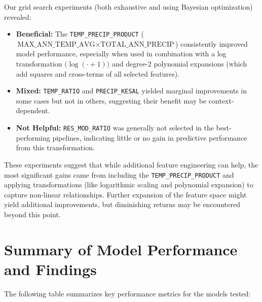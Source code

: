 \documentclass{article}
\begin{document}
Our grid search experiments (both exhaustive and using Bayesian optimization) revealed:
\begin{itemize}
    \item \textbf{Beneficial:} The \texttt{TEMP\_PRECIP\_PRODUCT} (\(\text{MAX\_ANN\_TEMP\_AVG} \times \text{TOTAL\_ANN\_PRECIP}\)) consistently improved model performance, especially when used in combination with a log transformation \(\bigl(\log(\cdot + 1)\bigr)\) and degree-2 polynomial expansions (which add squares and cross-terms of all selected features).
    \item \textbf{Mixed:} \texttt{TEMP\_RATIO} and \texttt{PRECIP\_KESAL} yielded marginal improvements in some cases but not in others, suggesting their benefit may be context-dependent.
    \item \textbf{Not Helpful:} \texttt{RES\_MOD\_RATIO} was generally not selected in the best-performing pipelines, indicating little or no gain in predictive performance from this transformation.
\end{itemize}


These experiments suggest that while additional feature engineering can help, the most significant gains came from including the \texttt{TEMP\_PRECIP\_PRODUCT} and applying transformations (like logarithmic scaling and polynomial expansion) to capture non-linear relationships. Further expansion of the feature space might yield additional improvements, but diminishing returns may be encountered beyond this point.

\section{Summary of Model Performance and Findings}
The following table summarizes key performance metrics for the models tested:
\end{document}
